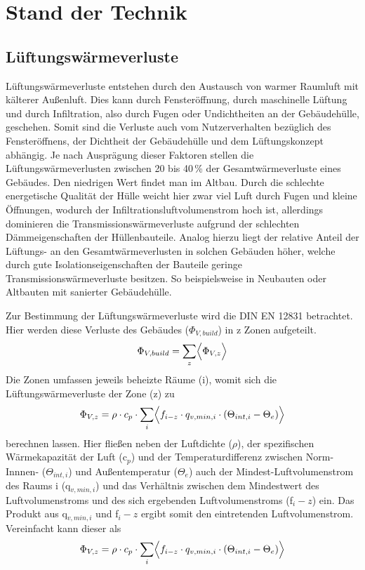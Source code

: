 \chapter{Stand der Technik}

\section{Lüftungswärmeverluste}
\label{sec:Sektion 31}

Lüftungswärmeverluste entstehen durch den Austausch von warmer Raumluft mit kälterer Außenluft.
Dies kann durch Fensteröffnung, durch maschinelle Lüftung und durch Infiltration, also durch Fugen oder Undichtheiten an der Gebäudehülle, geschehen.
Somit sind die Verluste auch vom Nutzerverhalten bezüglich des Fensteröffnens, der Dichtheit der Gebäudehülle und dem Lüftungskonzept abhängig.
Je nach Ausprägung dieser Faktoren stellen die Lüftungswärmeverlusten zwischen 20 bis 40\,\% der Gesamtwärmeverluste eines Gebäudes. 
Den niedrigen Wert findet man im Altbau. 
Durch die schlechte energetische Qualität der Hülle weicht hier zwar viel Luft durch Fugen und kleine Öffnungen, wodurch der Infiltrationsluftvolumenstrom hoch ist, allerdings dominieren die Transmissionswärmeverluste aufgrund der schlechten Dämmeigenschaften der Hüllenbauteile.
Analog hierzu liegt der relative Anteil der Lüftungs- an den Gesamtwärmeverlusten in solchen Gebäuden höher, welche durch gute Isolationseigenschaften der Bauteile geringe Transmissionswärmeverluste besitzen.
So beispielsweise in Neubauten oder Altbauten mit sanierter Gebäudehülle.

Zur Bestimmung der Lüftungswärmeverluste wird die DIN EN 12831 betrachtet.
Hier werden diese Verluste des Gebäudes (\(\Phi_{V,build}\)) in z Zonen aufgeteilt.
\begin{equation}
\label{eq:Gleichung311}
\Phi_{V,build} = \sum_{z} \Bigl\langle \Phi_{V,z} \Bigr\rangle
\end{equation}
Die Zonen umfassen jeweils beheizte Räume (i), womit sich die Lüftungswärmeverluste der Zone (z) zu
\begin{equation}
\label{eq:Gleichung312}
\Phi_{V,z} = \rho \cdot c_p \cdot \sum_{i} \Bigl\langle f_{i-z} \cdot q_{v,min,i} \cdot (\Theta_{int,i} - \Theta_e) \Bigr\rangle
\end{equation}
berechnen lassen.
Hier fließen neben der Luftdichte (\(\rho\)), der spezifischen Wärmekapazität der Luft (c\(_p\)) und der Temperaturdifferenz zwischen Norm-Innnen- (\(\Theta_{int,i}\)) und Außentemperatur (\(\Theta_{e}\)) auch der Mindest-Luftvolumenstrom des Raums i (q\(_{v,min,i}\)) und das Verhältnis zwischen dem Mindestwert des Luftvolumenstroms und des sich ergebenden Luftvolumenstroms (f\(_i-z\)) ein.
Das Produkt aus q\(_{v,min,i}\) und f\(_i-z\) ergibt somit den eintretenden Luftvolumenstrom.
Vereinfacht kann dieser als
\begin{equation}
\label{eq:Gleichung313}
\Phi_{V,z} = \rho \cdot c_p \cdot \sum_{i} \Bigl\langle f_{i-z} \cdot q_{v,min,i} \cdot (\Theta_{int,i} - \Theta_e) \Bigr\rangle
\end{equation}





